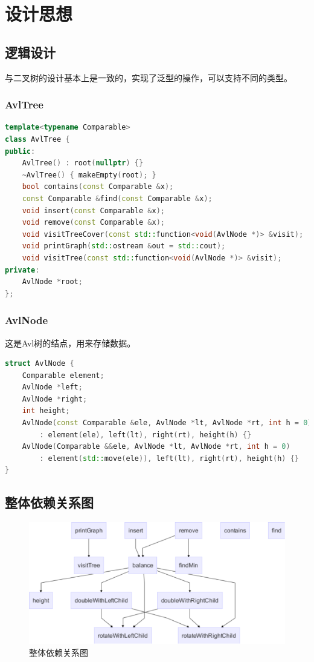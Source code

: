 \section{设计思想}
\subsection{逻辑设计}
与二叉树的设计基本上是一致的，实现了泛型的操作，可以支持不同的类型。

\subsubsection{AvlTree}
\begin{lstlisting}[language = c++]
template<typename Comparable>
class AvlTree {
public:
    AvlTree() : root(nullptr) {}
    ~AvlTree() { makeEmpty(root); }
    bool contains(const Comparable &x);
    const Comparable &find(const Comparable &x);
    void insert(const Comparable &x);
    void remove(const Comparable &x);
    void visitTreeCover(const std::function<void(AvlNode *)> &visit);
    void printGraph(std::ostream &out = std::cout);
    void visitTree(const std::function<void(AvlNode *)> &visit);
private:
    AvlNode *root;
};
\end{lstlisting}

\subsubsection{AvlNode}

这是Avl树的结点，用来存储数据。

\begin{lstlisting}[language = c++]
struct AvlNode {
    Comparable element;
    AvlNode *left;
    AvlNode *right;
    int height;
    AvlNode(const Comparable &ele, AvlNode *lt, AvlNode *rt, int h = 0)
        : element(ele), left(lt), right(rt), height(h) {}
    AvlNode(Comparable &&ele, AvlNode *lt, AvlNode *rt, int h = 0)
        : element(std::move(ele)), left(lt), right(rt), height(h) {}
}
\end{lstlisting}

\subsection{整体依赖关系图}

\begin{figure}[H]
    \centering
    \includegraphics[width=0.7\linewidth]{figures/depends}
    \caption{整体依赖关系图}
    \label{fig:depends}
\end{figure}


